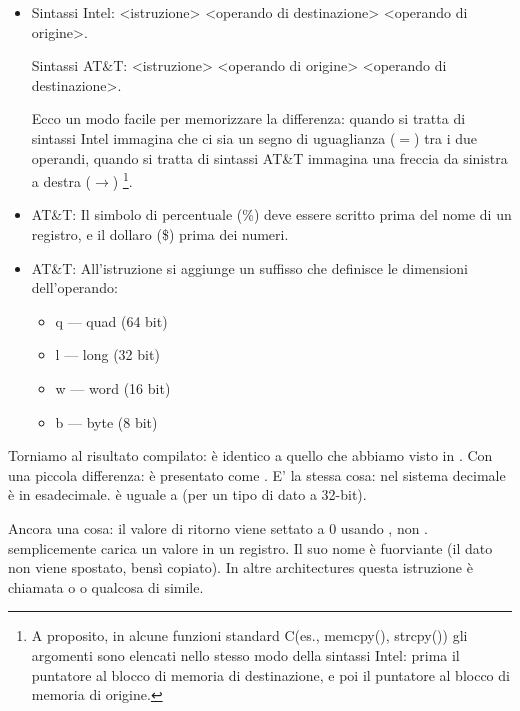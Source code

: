 \begin{itemize}

\item
\ITAph{}

Sintassi Intel: <istruzione> <operando di destinazione> <operando di origine>.

Sintassi AT\&T: <istruzione> <operando di origine> <operando di destinazione>.

Ecco un modo facile per memorizzare la differenza:
quando si tratta di sintassi Intel immagina che ci sia un segno di uguaglianza ($=$) tra i due operandi, quando si tratta di sintassi AT\&T immagina una freccia da sinistra a destra ($\rightarrow$)
\footnote{A proposito, in alcune funzioni standard C(es., memcpy(), strcpy()) gli argomenti sono elencati nello stesso modo della sintassi Intel: prima il puntatore al blocco di memoria di destinazione, e poi il puntatore al blocco di memoria di origine.}.

\item
AT\&T: Il simbolo di percentuale (\%) deve essere scritto prima del nome di un registro, e il dollaro (\$) prima dei numeri.

\item
AT\&T: All'istruzione si aggiunge un suffisso che definisce le dimensioni dell'operando:

\begin{itemize}
\item q --- quad (64 bit)
\item l --- long (32 bit)
\item w --- word (16 bit)
\item b --- byte (8 bit)
\end{itemize}

\end{itemize}

Torniamo al risultato compilato: è identico a quello che abbiamo visto in \IDA.
Con una piccola differenza:  è presentato come .
E' la stessa cosa:  nel sistema decimale è  in esadecimale.
 è uguale a  (per un tipo di dato a 32-bit).

Ancora una cosa: il valore di ritorno viene settato a 0 usando \MOV, non \XOR.
\MOV semplicemente carica un valore in un registro.
Il suo nome è fuorviante (il dato non viene spostato, bensì copiato). In altre architectures questa istruzione è chiamata  o  o qualcosa di simile.

